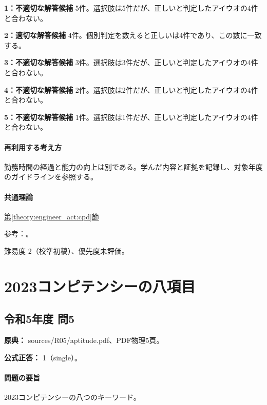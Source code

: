 \noindent\textbf{1：不適切な解答候補} 5件。選択肢は5件だが、正しいと判定したアイウオの4件と合わない。\par

\noindent\textbf{2：適切な解答候補} 4件。個別判定を数えると正しいは4件であり、この数に一致する。\par

\noindent\textbf{3：不適切な解答候補} 3件。選択肢は3件だが、正しいと判定したアイウオの4件と合わない。\par

\noindent\textbf{4：不適切な解答候補} 2件。選択肢は2件だが、正しいと判定したアイウオの4件と合わない。\par

\noindent\textbf{5：不適切な解答候補} 1件。選択肢は1件だが、正しいと判定したアイウオの4件と合わない。\par

\paragraph{再利用する考え方} 勤務時間の経過と能力の向上は別である。学んだ内容と証拠を記録し、対象年度のガイドラインを参照する。

\paragraph{共通理論} \hyperref[theory:engineer_act:cpd]{第\ref*{theory:engineer_act:cpd}節}

\par 参考：\cite{cpd_new2021,cpd_v3}。

\par 難易度 2（校準初稿）、優先度未評価。

\section{2023コンピテンシーの八項目}

\subsection{令和5年度 問5}
\label{q:r05-reg-apt-05}

\noindent\textbf{原典：} sources/R05/aptitude.pdf、PDF物理5頁。

\textbf{公式正答：} 1（single）。

\paragraph{問題の要旨} 2023コンピテンシーの八つのキーワード。


